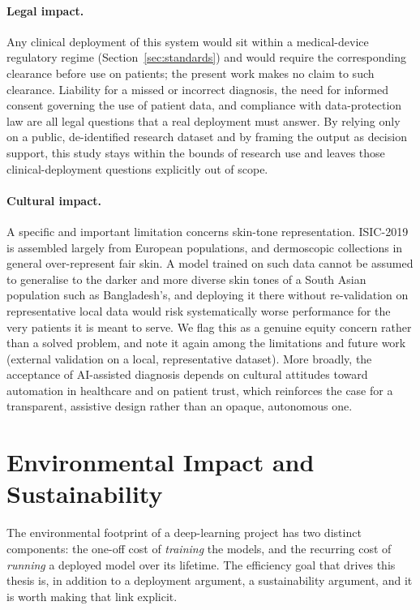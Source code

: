 \paragraph{Legal impact.}
Any clinical deployment of this system would sit within a medical-device
regulatory regime (Section~\ref{sec:standards}) and would require the
corresponding clearance before use on patients; the present work makes no
claim to such clearance. Liability for a missed or incorrect diagnosis, the
need for informed consent governing the use of patient data, and compliance
with data-protection law are all legal questions that a real deployment must
answer. By relying only on a public, de-identified research dataset and by
framing the output as decision support, this study stays within the bounds of
research use and leaves those clinical-deployment questions explicitly out of
scope.

\paragraph{Cultural impact.}
A specific and important limitation concerns skin-tone representation.
ISIC-2019 is assembled largely from European populations, and dermoscopic
collections in general over-represent fair skin. A model trained on such data
cannot be assumed to generalise to the darker and more diverse skin tones of a
South Asian population such as Bangladesh's, and deploying it there without
re-validation on representative local data would risk systematically worse
performance for the very patients it is meant to serve. We flag this as a
genuine equity concern rather than a solved problem, and note it again among
the limitations and future work (external validation on a local, representative
dataset). More broadly, the acceptance of AI-assisted diagnosis depends on
cultural attitudes toward automation in healthcare and on patient trust, which
reinforces the case for a transparent, assistive design rather than an opaque,
autonomous one.


\section{Environmental Impact and Sustainability}
\label{sec:environmental-impact}

The environmental footprint of a deep-learning project has two distinct
components: the one-off cost of \emph{training} the models, and the recurring
cost of \emph{running} a deployed model over its lifetime. The efficiency
goal that drives this thesis is, in addition to a deployment argument, a
sustainability argument, and it is worth making that link explicit.


